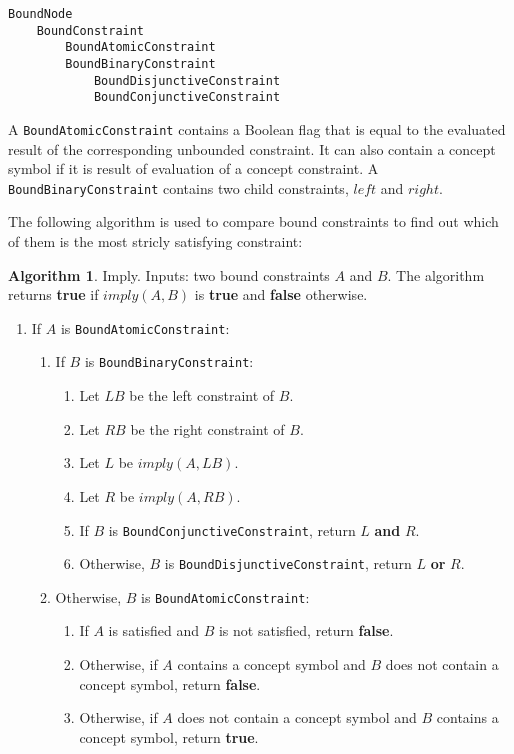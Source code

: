 \documentclass[a4paper,oneside,11pt]{book}
\theoremstyle{definition}
\newtheorem{algo}{Algorithm}[section]
\begin{document}
\begin{verbatim}
BoundNode
    BoundConstraint
        BoundAtomicConstraint
        BoundBinaryConstraint
            BoundDisjunctiveConstraint
            BoundConjunctiveConstraint
\end{verbatim}

A \verb|BoundAtomicConstraint| contains a Boolean flag that is equal to the evaluated result of the corresponding unbounded constraint.
It can also contain a concept symbol if it is result of evaluation of a concept constraint.
A \verb|BoundBinaryConstraint| contains two child constraints, $left$ and $right$.

The following algorithm is used to compare bound constraints to find out which of them is the most stricly satisfying constraint:

\begin{algo}\label{imply} Imply. Inputs: two bound constraints $A$ and $B$.
The algorithm returns \textbf{true} if $imply(A, B)$ is \textbf{true} and \textbf{false} otherwise.
\begin{enumerate}
\item
If $A$ is \verb|BoundAtomicConstraint|:
\begin{enumerate}
\item
If $B$ is \verb|BoundBinaryConstraint|:
\begin{enumerate}
\item
Let $LB$ be the left constraint of $B$.
\item
Let $RB$ be the right constraint of $B$.
\item
Let $L$ be $imply(A, LB)$.
\item
Let $R$ be $imply(A, RB)$.
\item
If $B$ is \verb|BoundConjunctiveConstraint|, return $L$ \textbf{and} $R$.
\item
Otherwise, $B$ is \verb|BoundDisjunctiveConstraint|, return $L$ \textbf{or} $R$.
\end{enumerate}
\item
Otherwise, $B$ is \verb|BoundAtomicConstraint|:
\begin{enumerate}
\item
If $A$ is satisfied and $B$ is not satisfied, return \textbf{false}.
\item
Otherwise, if $A$ contains a concept symbol and $B$ does not contain a concept symbol, return \textbf{false}.
\item
Otherwise, if $A$ does not contain a concept symbol and $B$ contains a concept symbol, return \textbf{true}.

\end{enumerate}
\end{enumerate}
\end{enumerate}
\end{algo}
\end{document}
